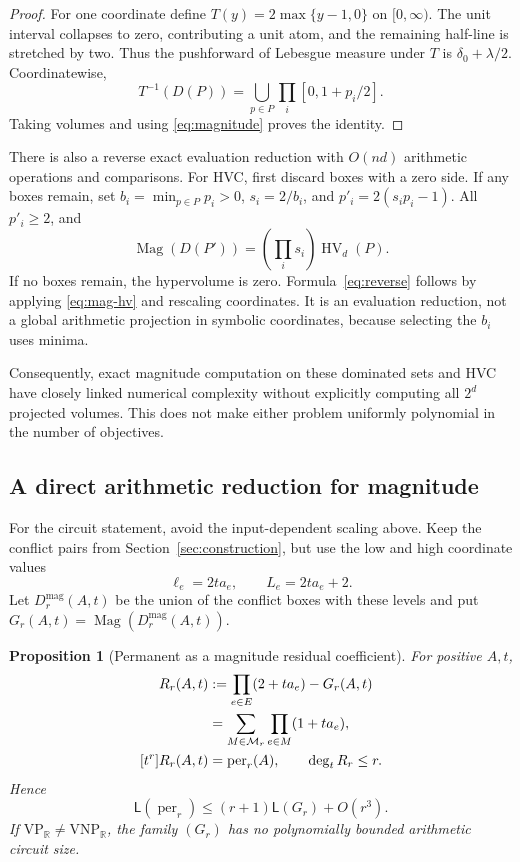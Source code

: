 \documentclass[12pt,a4paper]{article}
\newtheorem{proposition}[theorem]{Proposition}
\theoremstyle{definition}
\theoremstyle{remark}
\newcommand{\R}{\mathbb R}
\newcommand{\HV}{\operatorname{HV}}
\newcommand{\Mag}{\operatorname{Mag}}
\newcommand{\per}{\operatorname{per}}
\newcommand{\VP}{\mathrm{VP}}
\newcommand{\VNP}{\mathrm{VNP}}
\newcommand{\matchings}{\mathcal M_r}
\newcommand{\size}{\mathsf L}
\begin{document}
\begin{proof}
For one coordinate define $T(y)=2\max\{y-1,0\}$ on $[0,\infty)$.
The unit interval collapses to zero, contributing a unit atom, and the
remaining half-line is stretched by two. Thus the pushforward of
Lebesgue measure under $T$ is $\delta_0+\lambda/2$. Coordinatewise,
\[
 T^{-1}(D(P))=\bigcup_{p\in P}\prod_i[0,1+p_i/2].
\]
Taking volumes and using \eqref{eq:magnitude} proves the identity.
\end{proof}

There is also a reverse exact evaluation reduction with $O(nd)$
arithmetic operations and comparisons. For HVC, first discard
boxes with a zero side. If any boxes remain, set
$b_i=\min_{p\in P}p_i>0$, $s_i=2/b_i$, and
$p'_i=2(s_i p_i-1)$. All $p'_i\ge2$, and
\begin{equation}
 \Mag(D(P'))=\left(\prod_i s_i\right)\HV_d(P).
 \label{eq:reverse}
\end{equation}
If no boxes remain, the hypervolume is zero. Formula~\eqref{eq:reverse}
follows by applying \eqref{eq:mag-hv} and rescaling coordinates.
It is an evaluation reduction, not a global arithmetic projection in
symbolic coordinates, because selecting the $b_i$ uses minima.

Consequently, exact magnitude computation on these dominated sets and
HVC have closely linked numerical complexity without explicitly
computing all $2^d$ projected volumes. This does not make either problem
uniformly polynomial in the number of objectives.

\subsection{A direct arithmetic reduction for magnitude}

For the circuit statement, avoid the input-dependent scaling above.
Keep the conflict pairs from Section~\ref{sec:construction}, but use
the low and high coordinate values
\[
 \ell_e=2ta_e,\qquad L_e=2ta_e+2.
\]
Let $D^{\mathrm{mag}}_r(A,t)$ be the union of the conflict boxes with
these levels and put $G_r(A,t)=\Mag(D^{\mathrm{mag}}_r(A,t))$.

\begin{proposition}[Permanent as a magnitude residual coefficient]
\label{prop:mag-reduction}
For positive $A,t$,
\begin{align}
 R_r(A,t)
 &:=\prod_{e\in E}(2+ta_e)-G_r(A,t)\notag\\
 &=\sum_{M\in\matchings}\prod_{e\in M}(1+ta_e),
 \label{eq:mag-residual}\\
 [t^r]R_r(A,t)&=\per_r(A),\qquad \deg_t R_r\le r.
 \label{eq:mag-coefficient}
\end{align}
Hence
\begin{equation}
 \size(\per_r)\le(r+1)\size(G_r)+O(r^3).
 \label{eq:mag-transfer}
\end{equation}
If $\VP_{\R}\ne\VNP_{\R}$, the family $(G_r)$ has no
polynomially bounded arithmetic circuit size.
\end{proposition}
\end{document}
